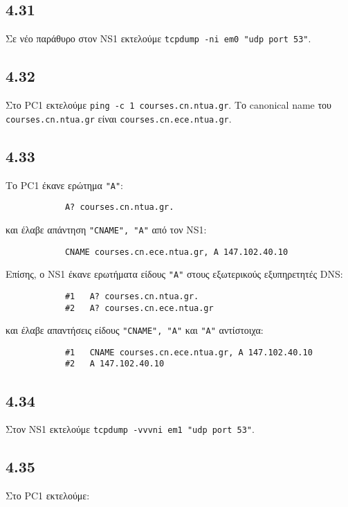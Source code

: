 \documentclass[a4paper, 12pt]{article}
\begin{document}
	\subsection*{4.31}
		Σε νέο παράθυρο στον NS1 εκτελούμε \verb|tcpdump -ni em0 "udp port 53"|.

	\subsection*{4.32}
		Στο PC1 εκτελούμε \verb|ping -c 1 courses.cn.ntua.gr|. Το canonical name του \verb|courses.cn.ntua.gr| είναι \verb|courses.cn.ece.ntua.gr|.

	\subsection*{4.33}
		Το PC1 έκανε ερώτημα \verb|"A"|:
		
		\begin{verbatim}
			A? courses.cn.ntua.gr.
		\end{verbatim}
		
		και έλαβε απάντηση \verb|"CNAME", "A"| από τον NS1:
		
		\begin{verbatim}
			CNAME courses.cn.ece.ntua.gr, A 147.102.40.10
		\end{verbatim}

		Επίσης, ο NS1 έκανε ερωτήματα είδους \verb|"A"| στους εξωτερικούς εξυπηρετητές DNS:
		
		\begin{verbatim}
			#1   A? courses.cn.ntua.gr.
			#2   A? courses.cn.ece.ntua.gr
		\end{verbatim} 
		
		και έλαβε απαντήσεις είδους \verb|"CNAME", "A"| και \verb|"A"| αντίστοιχα:
		
		\begin{verbatim}
			#1   CNAME courses.cn.ece.ntua.gr, A 147.102.40.10
			#2   A 147.102.40.10
		\end{verbatim}

	\subsection*{4.34}
		Στον NS1 εκτελούμε \verb|tcpdump -vvvni em1 "udp port 53"|.

	\subsection*{4.35} 
		Στο PC1 εκτελούμε:
		
\end{document}
